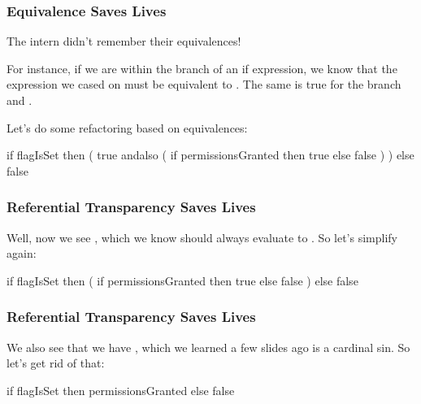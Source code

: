 \documentclass[aspectratio=169]{beamer}
\begin{document}
\begin{frame}[fragile]
  \frametitle{Equivalence Saves Lives}

  The intern didn't remember their equivalences!

  \pause
  \vspace{\fill}

  For instance, if we are within the  branch of
  an if expression, we know that the expression we cased on
  must be equivalent to . The same is true for
  the  branch and .

  \vspace{\fill}

  Let's do some refactoring based on equivalences:
  \pause
  \begin{codeblock}
    if flagIsSet then (
      true andalso (
        if permissionsGranted then
          true
        else
          false
      )
    ) else false
  \end{codeblock}
\end{frame}

\begin{frame}[fragile]
  \frametitle{Referential Transparency Saves Lives}

  Well, now we see , which we know should
  always evaluate to . So let's simplify again:

  \pause
  \vspace{\fill}

  \begin{codeblock}
    if flagIsSet then (
      if permissionsGranted then
        true
      else
        false
    ) else false
  \end{codeblock}
\end{frame}

\begin{frame}[fragile]
  \frametitle{Referential Transparency Saves Lives}

  We also see that we have ,
  which we learned a few slides ago is a cardinal sin. So let's
  get rid of that:

  \pause
  \vspace{\fill}

  \begin{codeblock}
    if flagIsSet then permissionsGranted
    else false
  \end{codeblock}
\end{frame}
\end{document}
